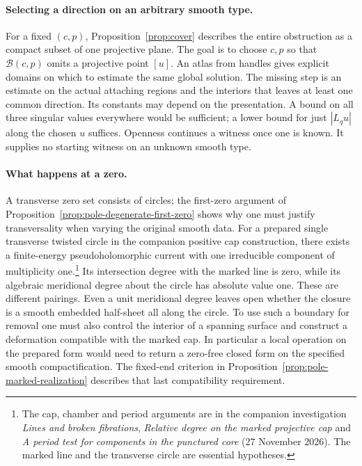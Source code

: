 \documentclass[11pt,letterpaper]{article}
\numberwithin{equation}{section}
\begin{document}
\paragraph{Selecting a direction on an arbitrary smooth type.}
For a fixed \((c,p)\), Proposition~\ref{prop:cover} describes the
entire obstruction as a compact subset of one projective plane.
The goal is to choose \(c,p\) so that \(\mathcal B(c,p)\) omits a projective point
\([u]\). An atlas from handles gives explicit domains on which to
estimate the same global solution. The missing step is an estimate on
the actual attaching regions and the interiors that leaves at least one
common direction. Its constants may depend on the presentation. A
bound on all three singular values everywhere would be sufficient;
a lower bound for just \(|L_qu|\) along the chosen \(u\) suffices.
Openness continues a witness once one is known. It supplies no
starting witness on an unknown smooth type.

\paragraph{What happens at a zero.}
A transverse zero set consists of circles; the first-zero argument of
Proposition~\ref{prop:pole-degenerate-first-zero} shows why one must
justify transversality when varying the original smooth data.
For a prepared single transverse twisted circle in the companion
positive cap construction, there exists a finite-energy
pseudoholomorphic current with one irreducible component of
multiplicity one.\footnote{The cap, chamber and period arguments are in
the companion investigation \emph{Lines and broken fibrations},
\emph{Relative degree on the marked projective cap} and \emph{A period test for components in the punctured
core} (27 November 2026). The marked line and the transverse circle
are essential hypotheses.} Its intersection degree with the
marked line is zero, while its algebraic meridional degree about the
circle has absolute value one. These are different pairings. Even
a unit meridional degree leaves open whether the closure is a
smooth embedded half-sheet all along the circle. To use such a
boundary for removal one must also control the interior of a
spanning surface and construct a deformation compatible with the
marked cap. In particular a local operation on the prepared form
would need to return a zero-free closed form on the specified smooth
compactification. The fixed-end criterion in
Proposition~\ref{prop:pole-marked-realization} describes that last
compatibility requirement.
\end{document}
